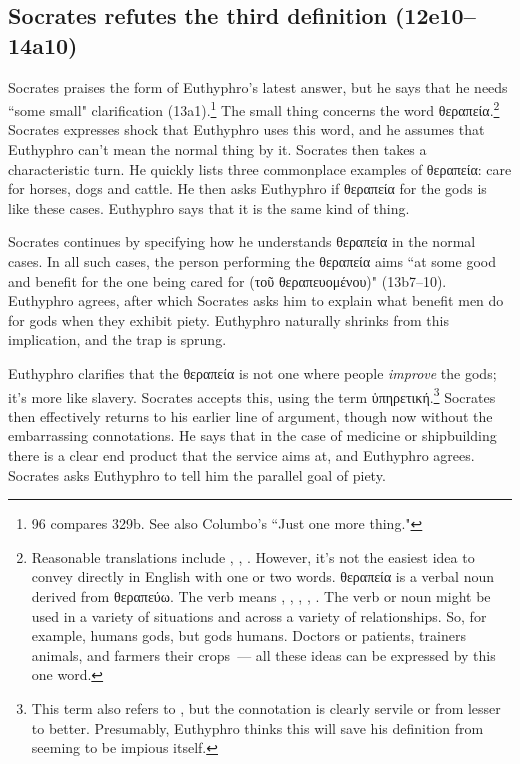\documentclass[11pt]{article}
\begin{document}
\subsection{Socrates refutes the third definition (12e10--14a10)}

Socrates praises the form of Euthyphro's latest answer, but he says that he needs ``some small" clarification (13a1).\footnote{\citet{bailly2003} 96 compares  329b.  See also Columbo's ``Just one more thing."}  The small thing concerns the word θεραπεία.\footnote{Reasonable translations include , , .  However, it's not the easiest idea to convey directly in English with one or two words.  θεραπεία is a verbal noun derived from θεραπεύω.  The verb means , , , , .  The verb or noun might be used in a variety of situations and across a variety of relationships.  So, for example, humans  gods, but gods  humans.  Doctors  or  patients, trainers  animals, and farmers  their crops~--- all these ideas can be expressed by this one word.}  Socrates expresses shock that Euthyphro uses this word, and he assumes that Euthyphro can't mean the normal thing by it.  Socrates then takes a characteristic turn.  He quickly lists three commonplace examples of θεραπεία: care for horses, dogs and cattle.  He then asks Euthyphro if θεραπεία for the gods is like these cases.  Euthyphro says that it is the same kind of thing.

Socrates continues by specifying how he understands θεραπεία in the normal cases.  In all such cases, the person performing the θεραπεία aims ``at some good and benefit for the one being cared for (τοῦ θεραπευομένου)" (13b7--10).  Euthyphro agrees, after which Socrates asks him to explain what benefit men do for gods when they exhibit piety.  Euthyphro naturally shrinks from this implication, and the trap is sprung.

Euthyphro clarifies that the θεραπεία is not one where people \emph{improve} the gods; it's more like slavery.  Socrates accepts this, using the term ὑπηρετική.\footnote{This term also refers to , but the connotation is clearly servile or from lesser to better.  Presumably, Euthyphro thinks this will save his definition from seeming to be impious itself.}  Socrates then effectively returns to his earlier line of argument, though now without the embarrassing connotations.  He says that in the case of medicine or shipbuilding there is a clear end product that the service aims at, and Euthyphro agrees.  Socrates asks Euthyphro to tell him the parallel goal of piety.
\end{document}
